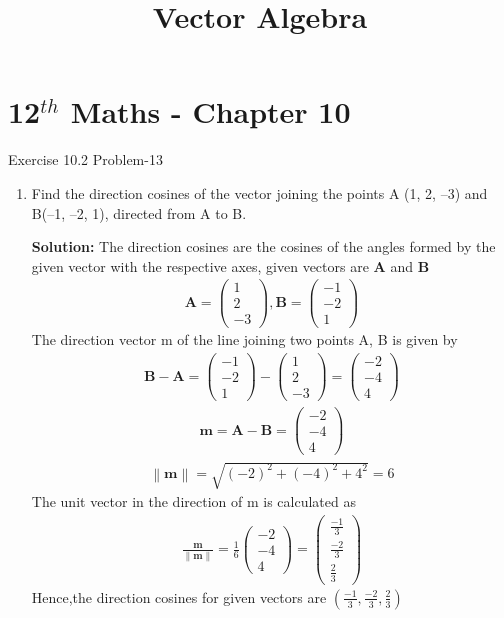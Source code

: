 \documentclass[12pt]{article}
\providecommand{\norm}[1]{\left\lVert#1\right\rVert}
\newcommand{\solution}{\noindent \textbf{Solution: }}
\newcommand{\myvec}[1]{\ensuremath{\begin{pmatrix}#1\end{pmatrix}}}
\let\vec\mathbf
\begin{document}
\begin{center}
\enlargethispage{-4cm}
\title{\textbf{Vector Algebra}}
\date{\vspace{-5ex}} %
\maketitle
\end{center}
\setcounter{page}{1}
\section*{12$^{th}$ Maths - Chapter 10}
 Exercise 10.2 Problem-13
\begin{enumerate}
\item Find the direction cosines of the vector joining the points A (1, 2, –3) and
B(–1, –2, 1), directed from A to B.

\solution The direction cosines are the cosines of the angles formed by the given vector with the respective axes, given vectors are $\vec{A}$ and $\vec{B}$
\begin{align}
	\vec{A} =\myvec{1\\2\\-3} , \vec{B}=\myvec{-1\\-2\\1}
\end{align}
The direction vector m of the line joining two points A, B is given by
\begin{align}
	\vec{B-A} = \myvec{-1\\-2\\1}-\myvec{1\\2\\-3}=\myvec{-2\\-4\\4}
\end{align}
\begin{align}
	\vec{m}=\vec{A-B}=\myvec{-2\\-4\\4}
\end{align}
\begin{align}
	\norm{\vec{m}}=\sqrt{(-2)^2+(-4)^2+4^2}=6
\end{align}
The unit vector in the direction of m is calculated as
\begin{align}
	\frac{\vec{m}}{\norm{\vec{m}}}=\frac{1}{6}{\myvec{-2\\-4\\4}}=\myvec{\frac{-1}{3}\\[4pt] \frac{-2}{3}\\[4pt] \frac{2}{3}}
\end{align}
Hence,the direction cosines for given vectors are $(\frac{-1}{3},\frac{-2}{3},\frac{2}{3})$
\end{enumerate}
\end{document}

